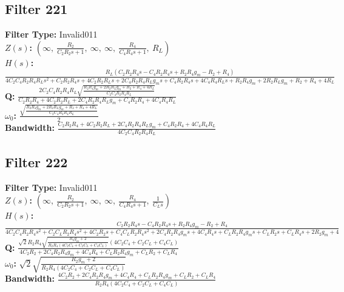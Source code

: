 \documentclass{article}
\begin{document}
\subsection*{Filter 221}
\textbf{Filter Type:} Invalid011 \\ 
\textbf{$Z(s)$:} $\left( \infty, \  \frac{R_{2}}{C_{2} R_{2} s + 1}, \  \infty, \  \infty, \  \frac{R_{4}}{C_{4} R_{4} s + 1}, \  R_{L}\right)$ \\ 
\textbf{$H(s)$:} $\frac{R_{L} \left(C_{2} R_{2} R_{4} s - C_{4} R_{2} R_{4} s + R_{2} R_{4} g_{m} - R_{2} + R_{4}\right)}{4 C_{2} C_{4} R_{2} R_{4} R_{L} s^{2} + C_{2} R_{2} R_{4} s + 4 C_{2} R_{2} R_{L} s + 2 C_{4} R_{2} R_{4} R_{L} g_{m} s + C_{4} R_{2} R_{4} s + 4 C_{4} R_{4} R_{L} s + R_{2} R_{4} g_{m} + 2 R_{2} R_{L} g_{m} + R_{2} + R_{4} + 4 R_{L}}$ \\ 
\textbf{Q:} $\frac{2 C_{2} C_{4} R_{2} R_{4} R_{L} \sqrt{\frac{R_{2} R_{4} g_{m} + 2 R_{2} R_{L} g_{m} + R_{2} + R_{4} + 4 R_{L}}{C_{2} C_{4} R_{2} R_{4} R_{L}}}}{C_{2} R_{2} R_{4} + 4 C_{2} R_{2} R_{L} + 2 C_{4} R_{2} R_{4} R_{L} g_{m} + C_{4} R_{2} R_{4} + 4 C_{4} R_{4} R_{L}}$ \\ 
\textbf{$\omega_0$:} $\frac{\sqrt{\frac{R_{2} R_{4} g_{m} + 2 R_{2} R_{L} g_{m} + R_{2} + R_{4} + 4 R_{L}}{C_{2} C_{4} R_{2} R_{4} R_{L}}}}{2}$ \\ 
\textbf{Bandwidth:} $\frac{C_{2} R_{2} R_{4} + 4 C_{2} R_{2} R_{L} + 2 C_{4} R_{2} R_{4} R_{L} g_{m} + C_{4} R_{2} R_{4} + 4 C_{4} R_{4} R_{L}}{4 C_{2} C_{4} R_{2} R_{4} R_{L}}$ \\ 
\subsection*{Filter 222}
\textbf{Filter Type:} Invalid011 \\ 
\textbf{$Z(s)$:} $\left( \infty, \  \frac{R_{2}}{C_{2} R_{2} s + 1}, \  \infty, \  \infty, \  \frac{R_{4}}{C_{4} R_{4} s + 1}, \  \frac{1}{C_{L} s}\right)$ \\ 
\textbf{$H(s)$:} $\frac{C_{2} R_{2} R_{4} s - C_{4} R_{2} R_{4} s + R_{2} R_{4} g_{m} - R_{2} + R_{4}}{4 C_{2} C_{4} R_{2} R_{4} s^{2} + C_{2} C_{L} R_{2} R_{4} s^{2} + 4 C_{2} R_{2} s + C_{4} C_{L} R_{2} R_{4} s^{2} + 2 C_{4} R_{2} R_{4} g_{m} s + 4 C_{4} R_{4} s + C_{L} R_{2} R_{4} g_{m} s + C_{L} R_{2} s + C_{L} R_{4} s + 2 R_{2} g_{m} + 4}$ \\ 
\textbf{Q:} $\frac{\sqrt{2} R_{2} R_{4} \sqrt{\frac{R_{2} g_{m} + 2}{R_{2} R_{4} \left(4 C_{2} C_{4} + C_{2} C_{L} + C_{4} C_{L}\right)}} \left(4 C_{2} C_{4} + C_{2} C_{L} + C_{4} C_{L}\right)}{4 C_{2} R_{2} + 2 C_{4} R_{2} R_{4} g_{m} + 4 C_{4} R_{4} + C_{L} R_{2} R_{4} g_{m} + C_{L} R_{2} + C_{L} R_{4}}$ \\ 
\textbf{$\omega_0$:} $\sqrt{2} \sqrt{\frac{R_{2} g_{m} + 2}{R_{2} R_{4} \left(4 C_{2} C_{4} + C_{2} C_{L} + C_{4} C_{L}\right)}}$ \\ 
\textbf{Bandwidth:} $\frac{4 C_{2} R_{2} + 2 C_{4} R_{2} R_{4} g_{m} + 4 C_{4} R_{4} + C_{L} R_{2} R_{4} g_{m} + C_{L} R_{2} + C_{L} R_{4}}{R_{2} R_{4} \left(4 C_{2} C_{4} + C_{2} C_{L} + C_{4} C_{L}\right)}$ \\ 
\end{document}
